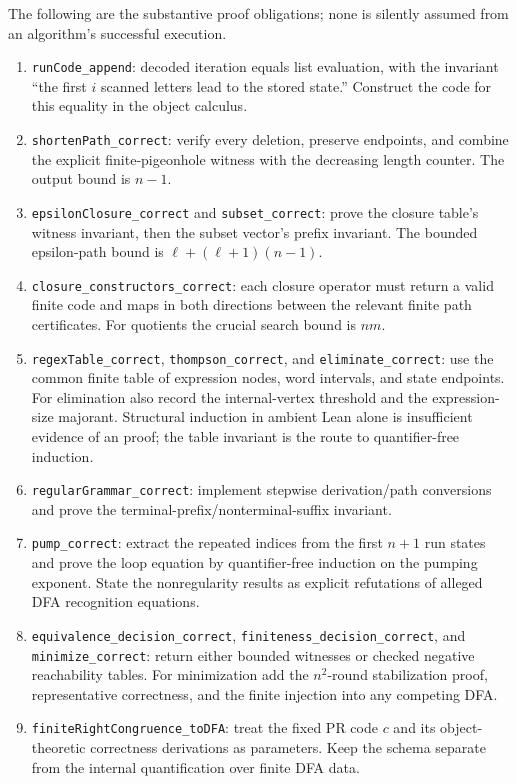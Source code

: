 The following are the substantive proof obligations; none is silently
assumed from an algorithm's successful execution.
\begin{enumerate}
\item \texttt{runCode\_append}: decoded iteration equals list evaluation,
with the invariant ``the first $i$ scanned letters lead to the stored
state.''  Construct the code for this equality in the object calculus.
\item \texttt{shortenPath\_correct}: verify every deletion, preserve endpoints,
and combine the explicit finite-pigeonhole witness with the decreasing
length counter.  The output bound is $n-1$.
\item \texttt{epsilonClosure\_correct} and \texttt{subset\_correct}: prove the
closure table's witness invariant, then the subset vector's prefix
invariant.  The bounded epsilon-path bound is
$\ell+(\ell+1)(n-1)$.
\item \texttt{closure\_constructors\_correct}: each closure operator must
return a valid finite code and maps in both directions between the relevant
finite path certificates.  For quotients the crucial search bound is $nm$.
\item \texttt{regexTable\_correct}, \texttt{thompson\_correct}, and
\texttt{eliminate\_correct}: use the common finite table of expression
nodes, word intervals, and state endpoints.  For elimination also record
the internal-vertex threshold and the expression-size majorant.  Structural
induction in ambient Lean alone is insufficient evidence of an \ipra{}
proof; the table invariant is the route to quantifier-free induction.
\item \texttt{regularGrammar\_correct}: implement stepwise derivation/path
conversions and prove the terminal-prefix/nonterminal-suffix invariant.
\item \texttt{pump\_correct}: extract the repeated indices from the first
$n+1$ run states and prove the loop equation by quantifier-free induction
on the pumping exponent.  State the nonregularity results as explicit
refutations of alleged DFA recognition equations.
\item \texttt{equivalence\_decision\_correct},
\texttt{finiteness\_decision\_correct}, and
\texttt{minimize\_correct}: return either bounded witnesses or checked
negative reachability tables.  For minimization add the $n^2$-round
stabilization proof, representative correctness, and the finite injection
into any competing DFA.
\item \texttt{finiteRightCongruence\_toDFA}: treat the fixed PR code $c$ and
its object-theoretic correctness derivations as parameters.  Keep the
schema separate from the internal quantification over finite DFA data.
\end{enumerate}


